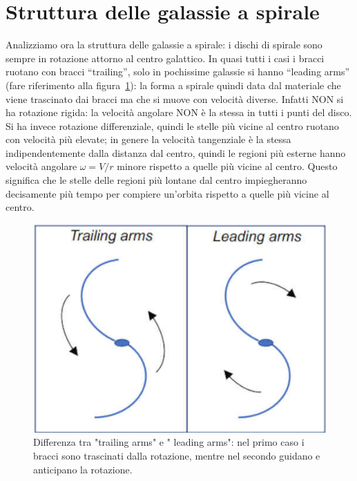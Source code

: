 \section{Struttura delle galassie a spirale}\label{sec:struttura-delle-galassie-a-spirale}
Analizziamo ora la struttura delle galassie a spirale: i dischi di spirale sono sempre in rotazione attorno al centro galattico. In quasi tutti i casi i bracci ruotano con bracci “trailing”, solo in pochissime galassie si hanno “leading arms” (fare riferimento alla figura~\ref{fig:trailing-leading arms}): la forma a spirale quindi data dal materiale che viene trascinato dai bracci ma che si muove con velocità diverse. Infatti NON si ha rotazione rigida: la velocità angolare NON è la stessa in tutti i punti del disco. Si ha invece rotazione differenziale, quindi le stelle più vicine al centro ruotano con velocità più elevate; in genere la velocità tangenziale è la stessa indipendentemente dalla distanza dal centro, quindi le regioni più esterne hanno velocità angolare $\omega = V/r$ minore rispetto a quelle più vicine al centro. Questo significa che le stelle delle regioni più lontane dal centro impiegheranno decisamente più tempo per compiere un'orbita rispetto a quelle più vicine al centro.

\begin{figure}
    \centering
    \includegraphics{immagini/trailing-leading-arms.jpg}
    \caption[width = 0.5 \textwidth]{Differenza tra "trailing arms" e " leading arms": nel primo caso i bracci sono trascinati dalla rotazione, mentre nel secondo guidano e anticipano la rotazione.}
    \label{fig:trailing-leading arms}
\end{figure}

